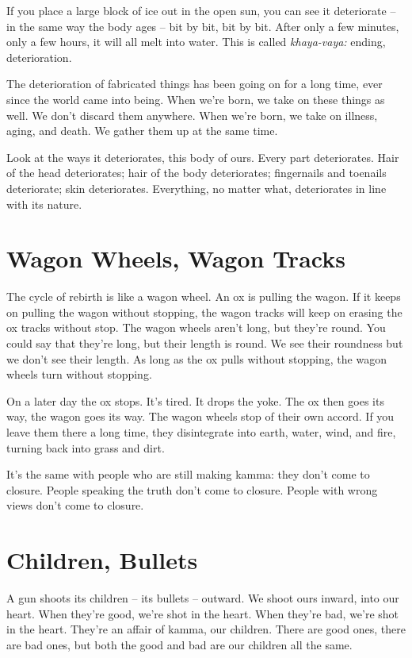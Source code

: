 If you place a large block of ice out in the open sun, you can see it deteriorate -- in the same way the body ages -- bit by bit, bit by bit. After only a few minutes, only a few hours, it will all melt into water. This is called \textit{khaya-vaya:} ending, deterioration.

The deterioration of fabricated things has been going on for a long time, ever since the world came into being. When we're born, we take on these things as well. We don't discard them anywhere. When we're born, we take on illness, aging, and death. We gather them up at the same time.

Look at the ways it deteriorates, this body of ours. Every part deteriorates. Hair of the head deteriorates; hair of the body deteriorates; fingernails and toenails deteriorate; skin deteriorates. Everything, no matter what, deteriorates in line with its nature.

\clearpage

\section{Wagon Wheels, Wagon Tracks}

The cycle of rebirth is like a wagon wheel. An ox is pulling the wagon. If it keeps on pulling the wagon without stopping, the wagon tracks will keep on erasing the ox tracks without stop. The wagon wheels aren't long, but they're round. You could say that they're long, but their length is round. We see their roundness but we don't see their length. As long as the ox pulls without stopping, the wagon wheels turn without stopping. 

On a later day the ox stops. It's tired. It drops the yoke. The ox then goes its way, the wagon goes its way. The wagon wheels stop of their own accord. If you leave them there a long time, they disintegrate into earth, water, wind, and fire, turning back into grass and dirt.

It's the same with people who are still making kamma: they don't come to closure. People speaking the truth don't come to closure. People with wrong views don't come to closure.

\clearpage

\section{Children, Bullets}

A gun shoots its children -- its bullets -- outward. We shoot ours inward, into our heart. When they're good, we're shot in the heart. When they're bad, we're shot in the heart. They're an affair of kamma, our children. There are good ones, there are bad ones, but both the good and bad are our children all the same. 

